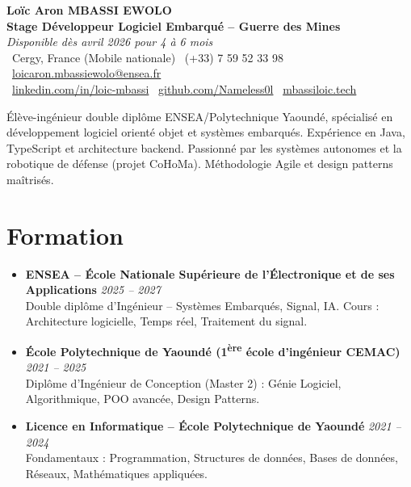 \documentclass[a4paper,11pt]{article}
\begin{document}
\begin{center}
    {\Large \textbf{Loïc Aron MBASSI EWOLO}} \\ \vspace{4pt}
    \textbf{\large Stage Développeur Logiciel Embarqué -- Guerre des Mines} \\
    \textit{\small Disponible dès avril 2026 pour 4 à 6 mois} \\ \vspace{4pt}
    \small
    \faMapMarker\ Cergy, France (Mobile nationale) \quad
    \faPhone\ (+33) 7 59 52 33 98 \quad
    \faEnvelope\ \href{mailto:loicaron.mbassiewolo@ensea.fr}{loicaron.mbassiewolo@ensea.fr} \\ \vspace{2pt}
    \faLinkedin\ \href{https://www.linkedin.com/in/loic-mbassi/}{linkedin.com/in/loic-mbassi} \quad
    \faGithub\ \href{https://github.com/Nameless0l}{github.com/Nameless0l} \quad
    \faGlobe\ \href{https://mbassiloic.tech}{mbassiloic.tech}
\end{center}

\vspace{-6pt}

\noindent\small{Élève-ingénieur double diplôme ENSEA/Polytechnique Yaoundé, spécialisé en développement logiciel orienté objet et systèmes embarqués. Expérience en Java, TypeScript et architecture backend. Passionné par les systèmes autonomes et la robotique de défense (projet CoHoMa). Méthodologie Agile et design patterns maîtrisés.}

\section{Formation}
\begin{itemize}[leftmargin=*, label=\tiny$\bullet$, nosep]
    \item \textbf{ENSEA -- École Nationale Supérieure de l'Électronique et de ses Applications} \hfill \textit{2025 -- 2027} \\
    \small{Double diplôme d'Ingénieur -- Systèmes Embarqués, Signal, IA. Cours : Architecture logicielle, Temps réel, Traitement du signal.}
    \item \textbf{École Polytechnique de Yaoundé (1\textsuperscript{ère} école d'ingénieur CEMAC)} \hfill \textit{2021 -- 2025} \\
    \small{Diplôme d'Ingénieur de Conception (Master 2) : Génie Logiciel, Algorithmique, POO avancée, Design Patterns.}
    \item \textbf{Licence en Informatique -- École Polytechnique de Yaoundé} \hfill \textit{2021 -- 2024} \\
    \small{Fondamentaux : Programmation, Structures de données, Bases de données, Réseaux, Mathématiques appliquées.}
\end{itemize}
\end{document}
